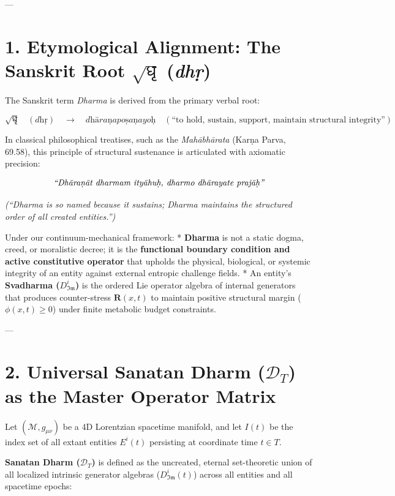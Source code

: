 \documentclass[11pt,a4paper]{article}
\theoremstyle{definition}
\theoremstyle{remark}
\begin{document}
---

\section{1. Etymological Alignment: The Sanskrit Root $\sqrt{\text{धृ}}$ (\textit{dhṛ})}

The Sanskrit term \textit{Dharma} is derived from the primary verbal root:

\begin{equation}
\sqrt{\text{धृ}} \quad (\textit{dhṛ}) \quad \longrightarrow \quad \textit{dhāraṇapoṣaṇayoḥ} \quad (\text{“to hold, sustain, support, maintain structural integrity”})
\end{equation}


In classical philosophical treatises, such as the \textit{Mahābhārata} (Karṇa Parva, 69.58), this principle of structural sustenance is articulated with axiomatic precision:

\begin{equation}
\text{\textit{“Dhāraṇāt dharmam ityāhuḥ, dharmo dhārayate prajāḥ”}}
\end{equation}

\textit{(“Dharma is so named because it sustains; Dharma maintains the structured order of all created entities.”)}

Under our continuum-mechanical framework:
* \textbf{Dharma} is not a static dogma, creed, or moralistic decree; it is the \textbf{functional boundary condition and active constitutive operator} that upholds the physical, biological, or systemic integrity of an entity against external entropic challenge fields.
* An entity's \textbf{Svadharma ($D_{\mathfrak{Im}}^i$)} is the ordered Lie operator algebra of internal generators that produces counter-stress $\mathbf{R}(x, t)$ to maintain positive structural margin ($\phi(x, t) \ge 0$) under finite metabolic budget constraints.

---

\section{2. Universal Sanatan Dharm ($\mathcal{D}_T$) as the Master Operator Matrix}

Let $(\mathcal{M}, g_{\mu\nu})$ be a 4D Lorentzian spacetime manifold, and let $I(t)$ be the index set of all extant entities $E^i(t)$ persisting at coordinate time $t \in T$.

\textbf{Sanatan Dharm ($\mathcal{D}_T$)} is defined as the uncreated, eternal set-theoretic union of all localized intrinsic generator algebras ($D_{\mathfrak{Im}}^i(t)$) across all entities and all spacetime epochs:
\end{document}
